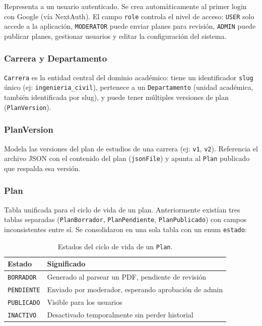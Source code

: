 \documentclass[12pt, a4paper]{report}
\begin{document}
Representa a un usuario autenticado. Se crea automáticamente al primer login con Google
(vía NextAuth). El campo \texttt{role} controla el nivel de acceso: \texttt{USER} solo
accede a la aplicación, \texttt{MODERATOR} puede enviar planes para revisión,
\texttt{ADMIN} puede publicar planes, gestionar usuarios y editar la configuración del
sistema.

\subsubsection*{Carrera y Departamento}

\texttt{Carrera} es la entidad central del dominio académico: tiene un identificador
\texttt{slug} único (ej: \texttt{ingenieria\_civil}), pertenece a un \texttt{Departamento}
(unidad académica, también identificada por slug), y puede tener múltiples versiones de
plan (\texttt{PlanVersion}).

\subsubsection*{PlanVersion}

Modela las versiones del plan de estudios de una carrera (ej: \texttt{v1}, \texttt{v2}).
Referencia el archivo JSON con el contenido del plan (\texttt{jsonFile}) y apunta al
\texttt{Plan} publicado que respalda esa versión.

\subsubsection*{Plan}

Tabla unificada para el ciclo de vida de un plan. Anteriormente existían tres tablas
separadas (\texttt{PlanBorrador}, \texttt{PlanPendiente}, \texttt{PlanPublicado}) con
campos inconsistentes entre sí. Se consolidaron en una sola tabla con un enum
\texttt{estado}:

\begin{table}[htbp]
\centering
\begin{tabular}{ll}
\toprule
\textbf{Estado} & \textbf{Significado} \\
\midrule
\texttt{BORRADOR}  & Generado al parsear un PDF, pendiente de revisión \\
\texttt{PENDIENTE} & Enviado por moderador, esperando aprobación de admin \\
\texttt{PUBLICADO} & Visible para los usuarios \\
\texttt{INACTIVO}  & Desactivado temporalmente sin perder historial \\
\bottomrule
\end{tabular}
\caption{Estados del ciclo de vida de un \texttt{Plan}.}
\label{tab:estados-plan}
\end{table}
\end{document}
